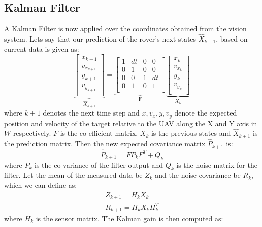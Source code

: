 \documentclass[conf]{new-aiaa}
\begin{document}
\subsection{Kalman Filter}
A Kalman Filter is now applied over the coordinates obtained from the vision system. Lets say that our prediction of the rover's next states $\hat{X}_{k+1}$, based on current data is given as:
\begin{equation}
    \underbrace{
    \begin{bmatrix}
    x_{k+1}\\
    v_{x_{k+1}}\\
    y_{k+1}\\
    v_{y_{k+1}}\\
    \end{bmatrix}
    }_{\hat{X}_{k+1}}
     = 
    \underbrace{\begin{bmatrix}
    1 & dt & 0 & 0\\
    0 & 1 & 0 & 0\\
    0 & 0 & 1 & dt\\
    0 & 1 & 0 & 1\\
    \end{bmatrix}}_\text{F}
    \underbrace{\begin{bmatrix}
    x_{k}\\
    v_{x_{k}}\\
    y_{k}\\
    v_{y_{k}}\\
    \end{bmatrix}}_{X_{k}}
\end{equation}
where $k+1$ denotes the next time step and $x, v_{x}, y, v_{y}$ denote the expected position and velocity of the target relative to the UAV along the X and Y axis in $W$ respectively. $F$ is the co-efficient matrix, $X_{k}$ is the previous states and $\hat{X}_{k+1}$ is the prediction matrix. Then the new expected covariance matrix $\hat{P}_{k+1}$ is:
\begin{equation}
    \hat{P}_{k+1} = FP_{k}F^T + Q_{k}
\end{equation}
where $P_{k}$ is the co-variance of the filter output and $Q_{k}$ is the noise matrix for the filter. Let the mean of the measured data be $Z_{k}$ and the noise covariance be $R_{k}$, which we can define as:
\begin{eqnarray}
    Z_{k+1} = H_{k}X_{k}\\
    R_{k+1} = H_{k}X_{k}H_{k}^{T}
\end{eqnarray}
where $H_{k}$ is the sensor matrix. The Kalman gain is then computed as:
\end{document}
